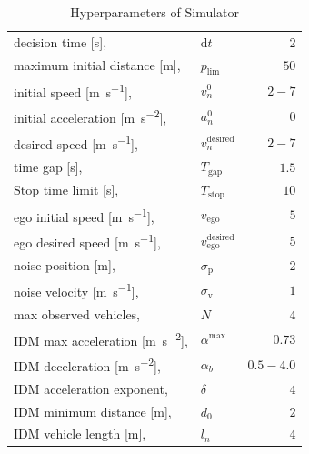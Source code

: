 \begin{table}[!h]
    \caption{Hyperparameters of Simulator}
    \label{tab:hyperparameters}
    \centering
    \begin{tabular}{l l r}
        \toprule
        decision time [\unit{\second}], & $\mathrm{d}t$ & $2$\\
        maximum initial distance [\unit{\meter}], & $p_\mathrm{lim}$ & $50$\\ 
        initial speed [\unit{\meter\per\second}], & $v^0_n $ & $2-7$\\
        initial acceleration [\unit{\meter\per\second\squared}], & $a^0_n $ & $0$\\
        desired speed [\unit{\meter\per\second}], & $v^\mathrm{desired}_n$ & $2-7$\\
        time gap [\unit{\second}], & $T_\mathrm{gap}$ & $1.5$\\
        Stop time limit [\unit{\second}], & $T_\mathrm{stop}$ & $10$\\
        ego initial speed [\unit{\meter\per\second}], & $v_\mathrm{ego}$ & $5$\\
        ego desired speed [\unit{\meter\per\second}], & $v_\mathrm{ego}^\mathrm{desired}$ & $5$\\
        noise position [\unit{\meter}], & $\sigma_\mathrm{p}$ & $2$\\ 
        noise velocity [\unit{\meter\per\second}], & $\sigma_\mathrm{v}$ & $1$\\ 
        max observed vehicles, & $N$ & $4$\\ 
    
            \midrule
            IDM max acceleration [\unit{\meter\per\second\squared}], & $\alpha^{\mathrm{max}} $ & $0.73$\\
            IDM deceleration [\unit{\meter\per\second\squared}], & $\alpha_b $ & $0.5 - 4.0$\\
            IDM acceleration exponent, & $\delta$ & $4$\\
            IDM minimum distance [\unit{\meter}], & $d_0$ & $2$\\
            IDM vehicle length [\unit{\meter}], & $l_n$ & $4$\\
        \midrule
        

\end{tabular}
\end{table}
